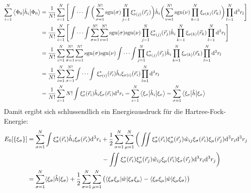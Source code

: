 \documentclass[9pt]{report}
\begin{document}
\begin{align}
\sum_{i=1}^{N}\big\langle\Phi_{0}\big|\hat{h}_{i}\big|\Phi_{0}\big\rangle &= \frac{1}{N!}\sum_{i=1}^{N}\Bigg[\int\cdots\int\bigg(\sum_{\sigma=1}^{N!}\mathrm{sgn}(\sigma)\prod_{j=1}^{N}\xi_{\sigma(j)}^{*}(\vec{r}_{j})\bigg)\hat{h}_{i}\bigg(\sum_{\nu=1}^{N!}\mathrm{sgn}(\nu)\prod_{k=1}^{N}\xi_{\nu(k)}(\vec{r}_{k})\bigg)\prod_{l=1}^{N}\mathrm{d}^{3}r_{l}\Bigg]\notag\\
&=\frac{1}{N!}\sum_{i=1}^{N}\Bigg[\int\cdots\int\sum_{\sigma=1}^{N!}\sum_{\nu=1}^{N!}\mathrm{sgn(\sigma)}\mathrm{sgn(\nu)}\prod_{j=1}^{N}\xi_{\sigma(j)}^{*}(\vec{r}_{j})\hat{h}_{i}\prod_{k=1}^{N}\xi_{\nu(k)}(\vec{r}_{k})\prod_{l=1}^{N}\mathrm{d}^{3}r_{l}\Bigg]\notag\\
&=\frac{1}{N!}\sum_{i=1}^{N}\sum_{\sigma=1}^{N!}\sum_{\nu=1}^{N!}\mathrm{sgn(\sigma)}\mathrm{sgn(\nu)}\int\cdots\int\prod_{j=1}^{N}\xi_{\sigma(j)}^{*}(\vec{r}_{j})\hat{h}_{i}\prod_{k=1}^{N}\xi_{\nu(k)}(\vec{r}_{k})\prod_{l=1}^{N}\mathrm{d}^{3}r_{l}\notag\\
&=\frac{1}{N!}\sum_{i=1}^{N}\sum_{\sigma=1}^{N!}\int\cdots\int\,\xi_{\sigma(i)}^{*}(\vec{r}_{i})\hat{h}_{i}\xi_{\sigma(i)}(\vec{r}_{i})\prod_{l=1}^{N}\mathrm{d}^{3}r_{l}\notag\\
&=\frac{1}{N!}\sum_{i=1}^{N}N!\int\xi_{\sigma}^{*}(\vec{r}_{i})\hat{h}_{i}\xi_{\sigma}(\vec{r}_{i})\mathrm{d}^{3}r_{i}=\sum_{i=1}^{N}\big\langle\xi_{\sigma}\big|\hat{h}_i\big|\xi_{\sigma}\big\rangle=\sum_{\sigma=1}^{N}\big\langle\xi_{\sigma}\big|\hat{h}\big|\xi_{\sigma}\big\rangle\notag
\end{align}
Damit ergibt sich schlussendlich ein Energieausdruck für die Hartree-Fock-Energie:
\begin{align}
E_{0}[\{\xi_{\sigma}\}]&=\sum_{\sigma=1}^{N}\int\xi_{\sigma}^{*}(\vec{r}_i)\hat{h}_{i}\xi_{\sigma}(\vec{r}_i)\mathrm{d}^3r_i +\frac{1}{2}\sum_{\sigma=1}^{N}\sum_{\mu=1}^{N}\bigg(\iint\xi_{\sigma}^{*}(\vec{r}_i)\xi_{\mu}^{*}(\vec{r}_j)\hat{w}_{ij}\xi_{\sigma}(\vec{r}_i)\xi_{\mu}(\vec{r}_j)\mathrm{d}^3r_i\mathrm{d}^3r_j\notag\\
&\qquad\qquad\qquad\qquad\qquad\qquad -\iint\xi_{\sigma}^{*}(\vec{r}_i)\xi_{\mu}^{*}(\vec{r}_j)\hat{w}_{ij}\xi_{\mu}(\vec{r}_i)\xi_{\sigma}(\vec{r}_j)\mathrm{d}^3r_i\mathrm{d}^3r_j\bigg)\\
&=\sum_{\sigma=1}^{N}\langle\xi_{\sigma}|\hat{h}|\xi_{\sigma}\rangle +\frac{1}{2}\sum_{\sigma=1}^{N}\sum_{\mu=1}^{N}\big(\langle\xi_{\sigma}\xi_{\mu}|\hat{w}|\xi_{\sigma}\xi_{\mu}\rangle - \langle\xi_{\sigma}\xi_{\mu}|\hat{w}|\xi_{\mu}\xi_{\sigma}\rangle\big)
\end{align}
\end{document}
